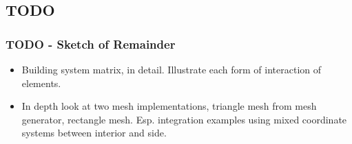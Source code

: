 \documentclass[compress]{beamer}
\begin{document}
\subsection{TODO}
\begin{frame}
  \frametitle{TODO - Sketch of Remainder}
  \begin{itemize}[<+->]
    \item Building system matrix, in detail.  Illustrate each form of interaction of elements.
    \item In depth look at two mesh implementations, triangle mesh from mesh generator, rectangle mesh.
      Esp. integration examples using mixed coordinate systems between interior and side.
  \end{itemize}
\end{frame}


  
\end{document}
